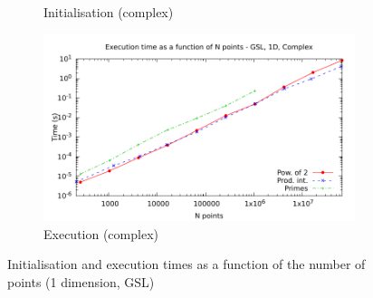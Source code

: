 \documentclass[12pt, a4paper]{article} \setlength{\textheight}{24cm}
\begin{document}
\begin{figure}[htb]
\begin{subfigure}{.5\textwidth}
    \caption{Initialisation (complex)}
    \label{1DGSLCI}
  \end{subfigure}%
  \begin{subfigure}{.5\textwidth}
    \centering
    \includegraphics[width=.9\linewidth]{graphs/1d-gsl-exec-c.pdf}
    \caption{Execution (complex)}
    \label{1DGSLC}
  \end{subfigure}
  \caption{Initialisation and execution times as a function of the
    number of points (1 dimension, GSL)}
  \label{1DGSL}
\end{figure}
\end{document}
